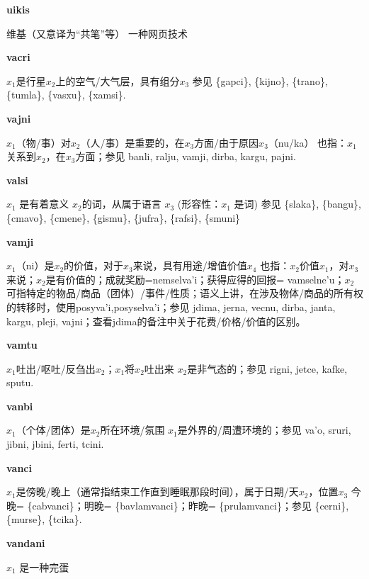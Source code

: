 \documentclass[notitlepage,twocolumn,a4paper,10pt]{book}
\begin{document}
{\sffamily\bfseries uikis} 维基（又意译为“共笔”等） \textemdash{} 一种网页技术

{\sffamily\bfseries vacri}\enspace {\ttfamily\bfseries[var]}  $x_1$是行星$x_2$上的空气\slash{}大气层，具有组分$x_3$ \textemdash{} 参见 \{gapci\}, \{kijno\}, \{trano\}, \{tumla\}, \{vasxu\}, \{xamsi\}.

{\sffamily\bfseries vajni}  $x_1$（物\slash{}事）对$x_2$（人\slash{}事）是重要的，在$x_3$方面\slash{}由于原因$x_3$（nu\slash{}ka） \textemdash{} 也指：$x_1$关系到$x_2$，在$x_3$方面；参见 {banli}, {ralju}, {vamji}, {dirba}, {kargu}, {pajni}.

{\sffamily\bfseries valsi}  $x_1$ 是有着意义 $x_2$的词，从属于语言 $x_3$ (形容性：$x_1$ 是词) \textemdash{} 参见 \{slaka\}, \{bangu\}, \{cmavo\}, \{cmene\}, \{gismu\}, \{jufra\}, \{rafsi\}, \{smuni\}

{\sffamily\bfseries vamji}\enspace {\ttfamily\bfseries[vam     va'i]}  $x_1$（ni）是$x_2$的价值，对于$x_3$来说，具有用途\slash{}增值价值$x_4$ \textemdash{} 也指：$x_2$价值$x_1$，对$x_3$来说；$x_2$是有价值的；成就奖励={nemselva'i}；获得应得的回报= {vamselne'u}；$x_2$可指特定的物品\slash{}商品（团体）\slash{}事件\slash{}性质；语义上讲，在涉及物体\slash{}商品的所有权的转移时，使用{posyva'i},{posyselva'i}；参见 {jdima}, {jerna}, {vecnu}, {dirba}, {janta}, {kargu}, {pleji}, {vajni}；查看{jdima}的备注中关于花费\slash{}价格\slash{}价值的区别。

{\sffamily\bfseries vamtu}\enspace {\ttfamily\bfseries[vat]}  $x_1$吐出\slash{}呕吐\slash{}反刍出$x_2$；$x_1$将$x_2$吐出来 \textemdash{} $x_2$是非气态的；参见 {rigni}, {jetce}, {kafke}, {sputu}.

{\sffamily\bfseries vanbi}\enspace {\ttfamily\bfseries[vab]}  $x_1$（个体\slash{}团体）是$x_2$所在环境\slash{}氛围 \textemdash{} $x_1$是外界的\slash{}周遭环境的；参见 {va'o}, {sruri}, {jibni}, {jbini}, {ferti}, {tcini}.

{\sffamily\bfseries vanci}\enspace {\ttfamily\bfseries[vac]}  $x_1$是傍晚\slash{}晚上（通常指结束工作直到睡眠那段时间），属于日期\slash{}天$x_2$，位置$x_3$ \textemdash{} 今晚= \{cabvanci\}；明晚= \{bavlamvanci\}；昨晚= \{prulamvanci\}；参见 \{cerni\}, \{murse\}, \{tcika\}.

{\sffamily\bfseries vandani} $x_1$ 是一种完蛋
\end{document}
